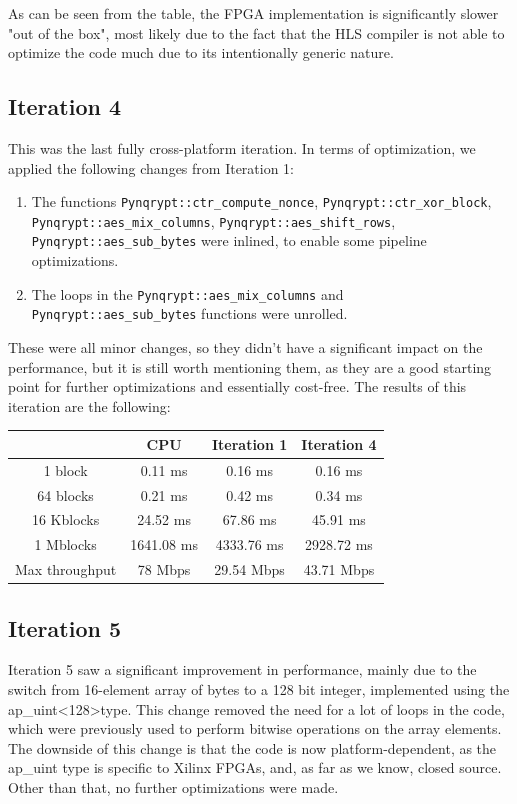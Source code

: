 \documentclass[12pt,oneside,a4paper]{article}
\begin{document}
As can be seen from the table, the FPGA implementation is significantly slower "out of the box", most likely due to the fact that the HLS compiler is not able to optimize the code much due to its intentionally generic nature.

\subsection{Iteration 4} \label{subsec:iter4}
This was the last fully cross-platform iteration.
In terms of optimization, we applied the following changes from Iteration 1:
\begin{enumerate}
	\item The functions {\tt Pynqrypt::ctr\_compute\_nonce}, {\tt Pynqrypt::ctr\_xor\_block}, {\tt Pynqrypt::aes\_mix\_columns}, {\tt Pynqrypt::aes\_shift\_rows}, \\ {\tt Pynqrypt::aes\_sub\_bytes} were inlined, to enable some pipeline optimizations.
	\item The loops in the {\tt Pynqrypt::aes\_mix\_columns} and {\tt Pynqrypt::aes\_sub\_bytes} functions were unrolled.
\end{enumerate}

These were all minor changes, so they didn't have a significant impact on the performance, but it is still worth mentioning them, as they are a good starting point for further optimizations and essentially cost-free.
The results of this iteration are the following:
\begin{table}[h!]
	\centering
	\begin{tabular}{cccc}
		\toprule
		 & CPU & Iteration 1 & Iteration 4 \\
		\midrule
		1 block & 0.11 ms & 0.16 ms & 0.16 ms \\
		64 blocks & 0.21 ms & 0.42 ms & 0.34 ms \\
		16 Kblocks & 24.52 ms & 67.86 ms & 45.91 ms \\
		1 Mblocks & 1641.08 ms & 4333.76 ms & 2928.72 ms \\
		Max throughput & 78 Mbps & 29.54 Mbps & 43.71 Mbps \\
		\bottomrule
	\end{tabular}
\end{table}

\subsection{Iteration 5} \label{subsec:iter5}
Iteration 5 saw a significant improvement in performance, mainly due to the switch from 16-element array of bytes to a 128 bit integer, implemented using the ap\_uint\textless128\textgreater type.
This change removed the need for a lot of loops in the code, which were previously used to perform bitwise operations on the array elements.
The downside of this change is that the code is now platform-dependent, as the ap\_uint type is specific to Xilinx FPGAs, and, as far as we know, closed source. Other than that, no further optimizations were made.
\end{document}
